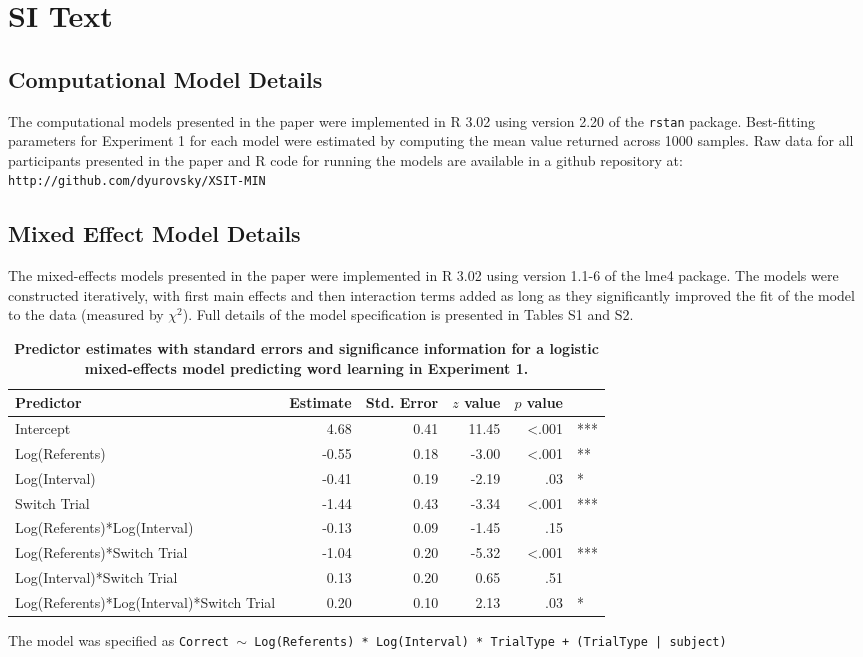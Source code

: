 \documentclass{pnastwo}
\begin{document}
\section{SI Text}

\subsection{Computational Model Details}

The computational models presented in the paper were implemented in R 3.02 using version 2.20 of the \texttt{rstan} package. Best-fitting parameters for Experiment 1 for each model were estimated by computing the mean value returned across 1000 samples. Raw data for all participants presented in the paper and R code for running the models are available in a github repository at: \small{\tt{http://github.com/dyurovsky/XSIT-MIN}}

\subsection{Mixed Effect Model Details}

The mixed-effects models presented in the paper were implemented in R 3.02 using version 1.1-6 of the lme4 package. The models were constructed iteratively, with first main effects and then interaction terms added as long as they significantly improved the fit of the model to the data (measured by $\chi^{2}$). Full details of the model specification is presented in Tables S1 and S2.

\vspace{12 pt}

\renewcommand\thetable{S\arabic{table}}

\begin{table}[ht]
\centering
\parbox{11cm}{\caption{\textbf{Predictor estimates with standard errors and significance information for a logistic mixed-effects model predicting word learning in Experiment 1.}}}
\begin{tabular}{lrrrrl}
 Predictor & Estimate & Std. Error & $z$ value & $p$ value &  \\ 
  \hline
Intercept & 4.68 & 0.41 & 11.45 & <.001 & *** \\ 
  Log(Referents) & -0.55 & 0.18 & -3.00 & <.001 & ** \\ 
  Log(Interval) & -0.41 & 0.19 & -2.19 & .03 & * \\ 
  Switch Trial & -1.44 & 0.43 & -3.34 & <.001 & *** \\ 
  Log(Referents)*Log(Interval) & -0.13 & 0.09 & -1.45 & .15 &  \\ 
  Log(Referents)*Switch Trial & -1.04 & 0.20 & -5.32 & <.001 & *** \\ 
  Log(Interval)*Switch Trial & 0.13 & 0.20 & 0.65 & .51 &  \\ 
  Log(Referents)*Log(Interval)*Switch Trial & 0.20 & 0.10 & 2.13 & .03 & * \\ 
   \hline
\end{tabular}
\vspace{6pt}
\parbox{11cm}{The model was specified as \small{\tt{Correct $\sim$  Log(Referents) * Log(Interval) * TrialType + (TrialType | subject)}}} 
\label{tab:exp1_reg}
\end{table}
\end{document}
